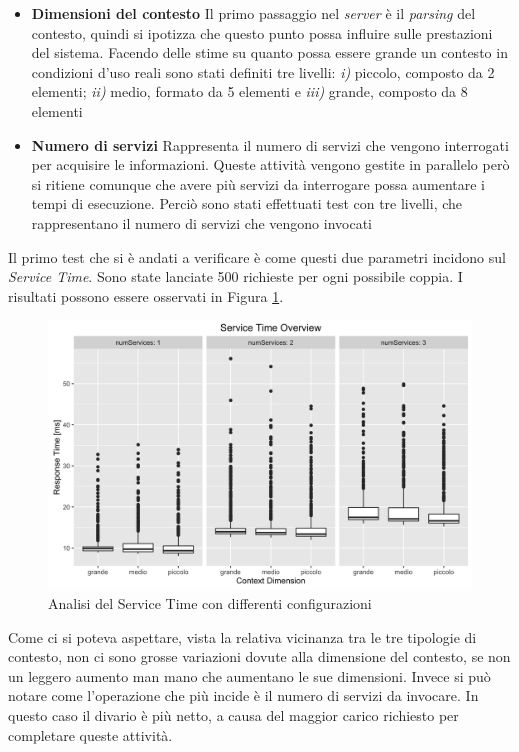 \begin{itemize}
	\item \textbf{Dimensioni del contesto}
	Il primo passaggio nel \emph{server} è il \emph{parsing} del contesto, quindi si ipotizza che questo punto possa influire sulle prestazioni del sistema. Facendo delle stime su quanto possa essere grande un contesto in condizioni d'uso reali sono stati definiti tre livelli: \emph{i)} piccolo, composto da 2 elementi; \emph{ii)} medio, formato da 5 elementi e \emph{iii)} grande, composto da 8 elementi
	\item \textbf{Numero di servizi}
	Rappresenta il numero di servizi che vengono interrogati per acquisire le informazioni. Queste attività vengono gestite in parallelo però si ritiene comunque che avere più servizi da interrogare possa aumentare i tempi di esecuzione. Perciò sono stati effettuati test con tre livelli, che rappresentano il numero di servizi che vengono invocati
\end{itemize}

Il primo test che si è andati a verificare è come questi due parametri incidono sul \emph{Service Time}. Sono state lanciate 500 richieste per ogni possibile coppia. I risultati possono essere osservati in Figura \ref{fig:service-time-overview}.

\begin{figure}[ht]
	\centering
	\includegraphics[width=\textwidth]{7-performance/Immagini/service_time_overview.png}
	\caption{Analisi del Service Time con differenti configurazioni}\label{fig:service-time-overview}
\end{figure}

Come ci si poteva aspettare, vista la relativa vicinanza tra le tre tipologie di contesto, non ci sono grosse variazioni dovute alla dimensione del contesto, se non un leggero aumento man mano che aumentano le sue dimensioni. Invece si può notare come l'operazione che più incide è il numero di servizi da invocare. In questo caso il divario è più netto, a causa del maggior carico richiesto per completare queste attività.

